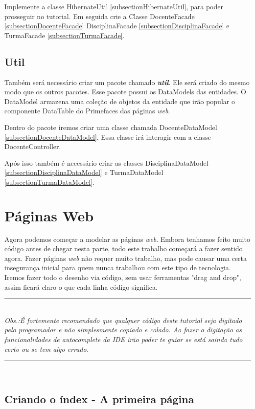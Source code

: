 \documentclass[12pt,a4paper]{article}
\begin{document}
 Implemente a classe HibernateUtil \ref{subsectionHibernateUtil}, para poder prosseguir no tutorial.
 Em seguida crie a Classe DocenteFacade \ref{subsectionDocenteFacade} DisciplinaFacade \ref{subsectionDisciplinaFacade} e TurmaFacade \ref{subsectionTurmaFacade}.
 
\subsection{Util}
Também será necessário criar um pacote chamado \textit{\textbf{util}}. Ele será criado do mesmo modo que os outros pacotes. Esse pacote possui os DataModels das entidades. O DataModel armazena uma coleção de objetos da entidade que irão popular o componente DataTable do Primefaces das páginas \textit{web}.

Dentro do pacote iremos criar uma classe chamada DocenteDataModel \ref{subsectionDocenteDataModel}. Essa classe irá interagir com a classe DocenteController.

Após isso também é necessário criar as classes DisciplinaDataModel \ref{subsectionDisciplinaDataModel} e TurmaDataModel \ref{subsectionTurmaDataModel}.

\newpage
\section{Páginas Web}

Agora podemos começar a modelar as páginas \textit{web}. Embora tenhamos feito muito código antes de chegar nesta parte, todo este trabalho começará a fazer sentido agora.
Fazer páginas \textit{web} não requer muito trabalho, mas pode causar uma certa insegurança inicial para quem nunca trabalhou com este tipo de tecnologia. Iremos fazer todo o desenho via código, sem usar ferramentas "drag and drop", assim ficará claro o que cada linha código significa. \\


\hrule
\hrulefill\\
\textit{Obs.:É fortemente recomendado que qualquer código deste tutorial seja digitado pelo programador e não simplesmente copiado e colado. Ao fazer a digitação as funcionalidades de autocomplete da IDE irão poder te guiar se está saindo tudo certo ou se tem algo errado.}\\
\hrule
\hrulefill\\


\subsection{Criando o índex - A primeira página}
\end{document}
